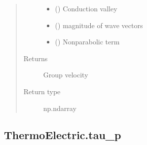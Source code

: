 \documentclass[letterpaper,10pt,english]{sphinxmanual}
\begin{document}
\begin{fulllineitems}
\begin{quote}
\begin{description}
\begin{itemize}
\item {} 
\sphinxAtStartPar
{} () \textendash{} Conduction valley

\item {} 
\sphinxAtStartPar
{} () \textendash{} magnitude of wave vectors

\item {} 
\sphinxAtStartPar
{} () \textendash{} Non\sphinxhyphen{}parabolic term

\end{itemize}

\item[{Returns}] \leavevmode
\sphinxAtStartPar
{} \textendash{} Group velocity

\item[{Return type}] \leavevmode
\sphinxAtStartPar
np.ndarray

\end{description}\end{quote}

\end{fulllineitems}



\subsection{ThermoElectric.tau\_p}
\label{\detokenize{autosummary/ThermoElectric.tau_p:thermoelectric-tau-p}}\label{\detokenize{autosummary/ThermoElectric.tau_p::doc}}
\end{document}
